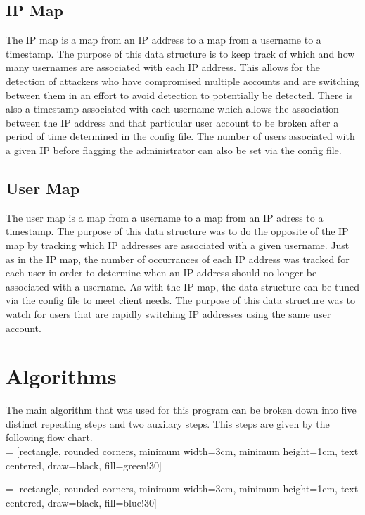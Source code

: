 \documentclass[12pt]{report}
\begin{document}
	\subsection*{IP Map}
	The IP map is a map from an IP address to a map from a username to a timestamp.
	The purpose of this data structure is to keep track of which and how many usernames
	are associated with each IP address. This allows for the detection of attackers who
	have compromised multiple accounts and are switching between them in an effort to avoid detection to potentially be detected. There is also a timestamp associated
	with each username which allows the association between the IP address and that
	particular user account to be broken after a period of time determined in the 
	config file. The number of users associated with a given IP before flagging the
	administrator can also be set via the config file.

	\subsection*{User Map}
	The user map is a map from a username to a map from an IP adress to a timestamp.
	The purpose of this data structure was to do the opposite of the IP map by tracking
	which IP addresses are associated with a given username. Just as in the IP map, the
	number of occurrances of each IP address was tracked for each user in order to determine when an IP address should no longer be associated with a username. As with
	the IP map, the data structure can be tuned via the config file to meet client needs.
	The purpose of this data structure was to watch for users that are rapidly switching IP
	addresses using the same user account. 

\section*{Algorithms}
	The main algorithm that was used for this program can be broken down into
	five distinct repeating steps and two auxilary steps. This steps are given
	by the following flow chart.\\

	 = [rectangle, rounded corners, minimum width=3cm, minimum height=1cm, text centered, draw=black, fill=green!30]

	 = [rectangle, rounded corners, minimum width=3cm, minimum
	height=1cm, text centered, draw=black, fill=blue!30]
\end{document}
